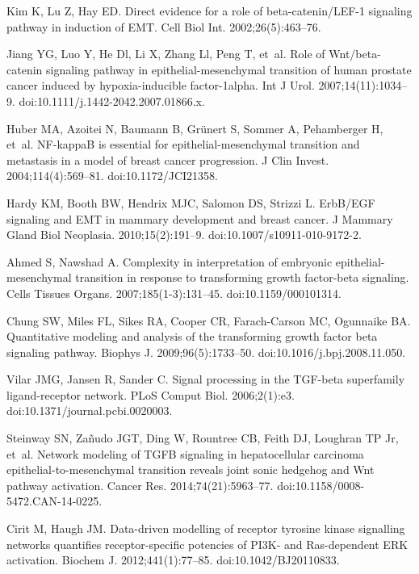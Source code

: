 \documentclass[11pt,letterpaper]{article}
\begin{document}
\begin{thebibliography}{10}
Kim K, Lu Z, Hay ED.
\newblock Direct evidence for a role of beta-catenin/LEF-1 signaling pathway in
  induction of EMT.
\newblock Cell Biol Int. 2002;26(5):463--76.

Jiang YG, Luo Y, He Dl, Li X, Zhang Ll, Peng T, et~al.
\newblock Role of Wnt/beta-catenin signaling pathway in epithelial-mesenchymal
  transition of human prostate cancer induced by hypoxia-inducible
  factor-1alpha.
\newblock Int J Urol. 2007;14(11):1034--9.
\newblock doi:{10.1111/j.1442-2042.2007.01866.x}.

Huber MA, Azoitei N, Baumann B, Gr{\"u}nert S, Sommer A, Pehamberger H, et~al.
\newblock NF-kappaB is essential for epithelial-mesenchymal transition and
  metastasis in a model of breast cancer progression.
\newblock J Clin Invest. 2004;114(4):569--81.
\newblock doi:{10.1172/JCI21358}.

Hardy KM, Booth BW, Hendrix MJC, Salomon DS, Strizzi L.
\newblock ErbB/EGF signaling and EMT in mammary development and breast cancer.
\newblock J Mammary Gland Biol Neoplasia. 2010;15(2):191--9.
\newblock doi:{10.1007/s10911-010-9172-2}.

Ahmed S, Nawshad A.
\newblock Complexity in interpretation of embryonic epithelial-mesenchymal
  transition in response to transforming growth factor-beta signaling.
\newblock Cells Tissues Organs. 2007;185(1-3):131--45.
\newblock doi:{10.1159/000101314}.

Chung SW, Miles FL, Sikes RA, Cooper CR, Farach-Carson MC, Ogunnaike BA.
\newblock Quantitative modeling and analysis of the transforming growth factor
  beta signaling pathway.
\newblock Biophys J. 2009;96(5):1733--50.
\newblock doi:{10.1016/j.bpj.2008.11.050}.

Vilar JMG, Jansen R, Sander C.
\newblock Signal processing in the TGF-beta superfamily ligand-receptor
  network.
\newblock PLoS Comput Biol. 2006;2(1):e3.
\newblock doi:{10.1371/journal.pcbi.0020003}.

Steinway SN, Za{\~n}udo JGT, Ding W, Rountree CB, Feith DJ, Loughran TP Jr,
  et~al.
\newblock Network modeling of TGFB signaling in hepatocellular carcinoma
  epithelial-to-mesenchymal transition reveals joint sonic hedgehog and Wnt
  pathway activation.
\newblock Cancer Res. 2014;74(21):5963--77.
\newblock doi:{10.1158/0008-5472.CAN-14-0225}.

Cirit M, Haugh JM.
\newblock Data-driven modelling of receptor tyrosine kinase signalling networks
  quantifies receptor-specific potencies of PI3K- and Ras-dependent ERK
  activation.
\newblock Biochem J. 2012;441(1):77--85.
\newblock doi:{10.1042/BJ20110833}.


\end{thebibliography}
\end{document}
